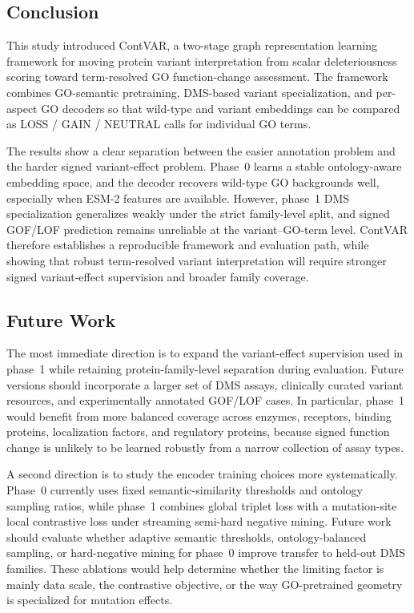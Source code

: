 \documentclass[11pt,a4paper]{article}
\begin{document}
\subsection{Conclusion}
This study introduced ContVAR, a two-stage graph representation learning framework for moving protein variant interpretation from scalar deleteriousness scoring toward term-resolved GO function-change assessment. The framework combines GO-semantic pretraining, DMS-based variant specialization, and per-aspect GO decoders so that wild-type and variant embeddings can be compared as LOSS / GAIN / NEUTRAL calls for individual GO terms.

The results show a clear separation between the easier annotation problem and the harder signed variant-effect problem. Phase~0 learns a stable ontology-aware embedding space, and the decoder recovers wild-type GO backgrounds well, especially when ESM-2 features are available. However, phase~1 DMS specialization generalizes weakly under the strict family-level split, and signed GOF/LOF prediction remains unreliable at the variant--GO-term level. ContVAR therefore establishes a reproducible framework and evaluation path, while showing that robust term-resolved variant interpretation will require stronger signed variant-effect supervision and broader family coverage.

\subsection{Future Work}
The most immediate direction is to expand the variant-effect supervision used in phase~1 while retaining protein-family-level separation during evaluation. Future versions should incorporate a larger set of DMS assays, clinically curated variant resources, and experimentally annotated GOF/LOF cases. In particular, phase~1 would benefit from more balanced coverage across enzymes, receptors, binding proteins, localization factors, and regulatory proteins, because signed function change is unlikely to be learned robustly from a narrow collection of assay types.

A second direction is to study the encoder training choices more systematically. Phase~0 currently uses fixed semantic-similarity thresholds and ontology sampling ratios, while phase~1 combines global triplet loss with a mutation-site local contrastive loss under streaming semi-hard negative mining. Future work should evaluate whether adaptive semantic thresholds, ontology-balanced sampling, or hard-negative mining for phase~0 improve transfer to held-out DMS families. These ablations would help determine whether the limiting factor is mainly data scale, the contrastive objective, or the way GO-pretrained geometry is specialized for mutation effects.
\end{document}
